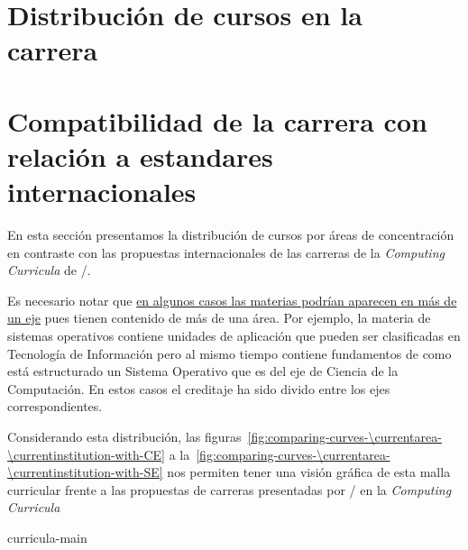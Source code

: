 \begin{btUnit}
\begin{landscape}
\end{landscape}



\section{Distribución de cursos en la carrera}

\section{Compatibilidad de la carrera con relación a estandares internacionales}
En esta sección presentamos la distribución de cursos por áreas de concentración en 
contraste con las propuestas internacionales de las carreras de la \textit{Computing Curricula} 
de /.

Es necesario notar que \underline{en algunos casos las materias podrían aparecen en más de un eje} 
pues tienen contenido de más de una área. 
Por ejemplo, la materia de sistemas operativos contiene unidades de aplicación 
que pueden ser clasificadas en Tecnología de Información pero al mismo tiempo contiene fundamentos 
de como está estructurado un Sistema Operativo que es del eje de Ciencia de la Computación. 
En estos casos el creditaje ha sido divido entre los ejes correspondientes.


Considerando esta distribución, las figuras~\ref{fig:comparing-curves-\currentarea-\currentinstitution-with-CE} 
a la~\ref{fig:comparing-curves-\currentarea-\currentinstitution-with-SE} 
nos permiten tener una visión gráfica de esta malla curricular frente a las propuestas de 
carreras presentadas por / en la \textit{Computing Curricula}



\begin{btSect}[apalike]{curricula-main}
\section*{\BibliographySection}
\btPrintCited
\end{btSect}
\end{btUnit}
  

